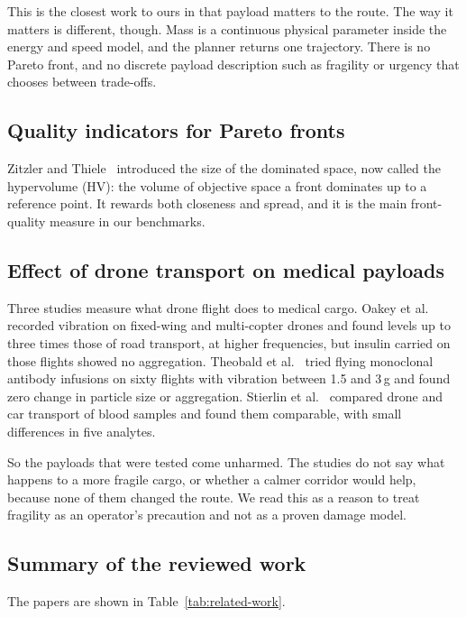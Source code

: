 This is the closest work to ours in that payload matters to the route. The way it
matters is different, though. Mass is a continuous physical parameter inside the
energy and speed model, and the planner returns one trajectory. There is no Pareto
front, and no discrete payload description such as fragility or urgency that chooses
between trade-offs.

\subsection{Quality indicators for Pareto fronts}

Zitzler and Thiele~\cite{r18} introduced the size of the dominated space, now called the
hypervolume (HV): the volume of objective space a front dominates up to a reference
point. It rewards both closeness and spread, and it is the main front-quality measure in
our benchmarks.

\subsection{Effect of drone transport on medical payloads}

Three studies measure what drone flight does to medical cargo. Oakey et al.~\cite{r13}
recorded vibration on fixed-wing and multi-copter drones and found levels up to three
times those of road transport, at higher frequencies, but insulin carried on those
flights showed no aggregation. Theobald et al.~\cite{r14} tried flying monoclonal
antibody infusions on sixty flights with vibration between 1.5 and 3\,g and found zero
change in particle size or aggregation. Stierlin et al.~\cite{r15} compared drone and car
transport of blood samples and found them comparable, with small differences in five
analytes.

So the payloads that were tested come unharmed. The studies
do not say what happens to a more fragile cargo, or whether a calmer corridor would
help, because none of them changed the route. We read this as a reason to treat
fragility as an operator's precaution and not as a proven damage model.

\subsection{Summary of the reviewed work}

The papers are shown in Table~\ref{tab:related-work}.

